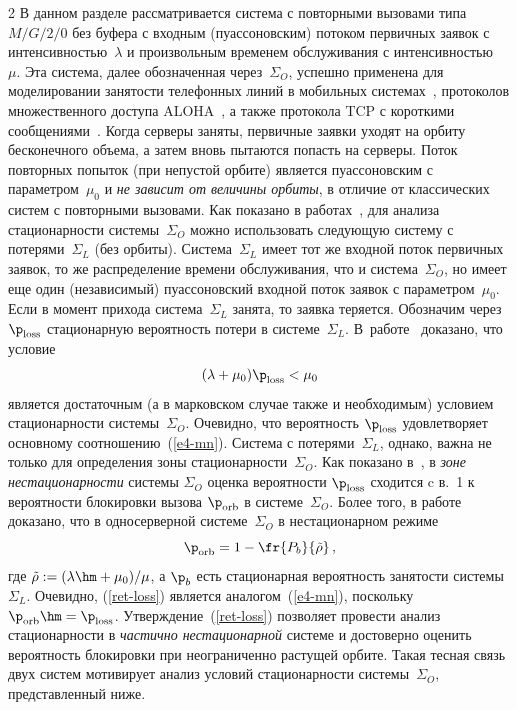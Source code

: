 \begin{multicols}{2}
В данном разделе рассматривается  система с повторными вызовами типа $M/G/2/0$
без буфера  с входным (пуассоновским) потоком первичных заявок с интенсивностью~$\lambda$
 и произвольным  временем  обслуживания  с интенсивностью~ $\mu$.  
 Эта сис\-те\-ма, далее обозначенная через~$\Sigma_O$,  успешно
применена для моделировании занятости телефонных линий в мобильных сис\-те\-мах~\cite{F86}, 
протоколов множественного доступа ALOHA~\cite{C93}, а также
 протокола  TCP с короткими сообщениями~\cite{AY08}. Когда серверы заняты, первичные заявки
 уходят  на орбиту  бесконечного объема, а затем вновь пытаются попасть  на серверы.
  Поток повторных попыток (при непустой орбите) является пуассоновским с  па\-ра\-мет\-ром~$\mu_0$ 
  и  {\it не зависит от величины орбиты}, в отличие от классических  сис\-тем с повторными вызовами.
Как показано в работах~\cite{Avr, GM, MorNek},  для анализа стационарности сис\-те\-мы~$\Sigma_O$
можно использовать  следующую сис\-те\-му с потерями~$\Sigma_L$ (без орбиты).
 Сис\-те\-ма~$\Sigma_L$ имеет  тот же входной   поток первичных заявок, то же распределение
  времени обслуживания, что и сис\-те\-ма~$\Sigma_O$, но
  имеет еще  один (независимый) пуассоновский входной поток заявок с параметром~$\mu_0$.
 Если в момент прихода  сис\-те\-ма~$\Sigma_L$ занята, то заявка   теряется.
 Обозначим через $\p_{\mathrm{loss}}$ стационарную вероятность потери в сис\-те\-ме~$ \Sigma_L $. 
 В~работе~\cite {Avr} доказано,  что условие 
 \begin{equation}
(\lambda+\mu_0)\p_{\mathrm{loss}}<\mu_0 
\label{st_cond}
\end{equation}
является достаточным (а в марковском случае также и необходимым) условием стационарности
сис\-те\-мы~$\Sigma_O$. Очевидно, что вероятность $\p_{\mathrm{loss}}$ удовлетворяет
основному соотношению~(\ref{e4-mn}). Сис\-те\-ма с потерями~$ \Sigma_L $, однако, важна
не только для определения зоны стационарности~$\Sigma_O$. Как показано в~\cite{Minsk, GM}, 
в {\it зоне нестационарности} системы $\Sigma_O$ оценка
вероятности $\p_{\mathrm{loss}}$ сходится c в.~1 к вероятности блокировки вызова
$\p_{\mathrm{orb}}$ в сис\-те\-ме~$\Sigma_O$. Более того, в работе~\cite{MorNek} доказано,
что в односерверной сис\-те\-ме~$\Sigma_O$ в нестационарном режиме 
\begin{equation}
\label{ret-loss} 
\p_{\mathrm{orb}}=1-\fr{P_b}{\tilde{\rho}}\,, 
\end{equation} 
где $\tilde{\rho}:=(\lambda\hm+ \mu_0)/\mu $, а $\p_b$ есть стационарная веро\-ятность
занятости системы~$\Sigma_L $. Очевидно, (\ref{ret-loss}) является  аналогом~(\ref{e4-mn}), 
поскольку $\p_{\mathrm{orb}}\hm=\p_{\mathrm{loss}}$. Утверждение~(\ref{ret-loss})  поз\-во\-ля\-ет
провести анализ стационарности в {\it частично нестационарной} сис\-те\-ме и
достоверно оценить вероятность блокировки при неограниченно
растущей орбите. Такая тесная связь двух систем мотивирует анализ условий
стационарности системы~$\Sigma_O$, представленный ниже.


\end{multicols}
